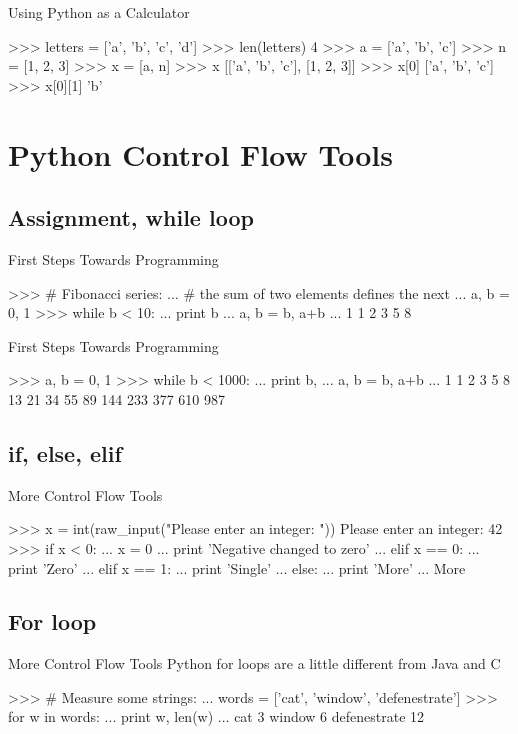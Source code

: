 \documentclass[11pt]{beamer}
\begin{document}
\begin{frame}[containsverbatim]{Using Python as a Calculator}
\begin{python}
>>> letters = ['a', 'b', 'c', 'd']
>>> len(letters)
4
>>> a = ['a', 'b', 'c']
>>> n = [1, 2, 3]
>>> x = [a, n]
>>> x
[['a', 'b', 'c'], [1, 2, 3]]
>>> x[0]
['a', 'b', 'c']
>>> x[0][1]
'b'
\end{python}
\end{frame}

\section{Python Control Flow Tools}
\subsection{Assignment, while loop}
\begin{frame}[containsverbatim]{First Steps Towards Programming}
\begin{python}
>>> # Fibonacci series:
... # the sum of two elements defines the next
... a, b = 0, 1
>>> while b < 10:
...    print b
...    a, b = b, a+b
...
1
1
2
3
5
8
\end{python}
\end{frame}


\begin{frame}[containsverbatim]{First Steps Towards Programming}
\begin{python}
>>> a, b = 0, 1
>>> while b < 1000:
...    print b,
...    a, b = b, a+b
...
1 1 2 3 5 8 13 21 34 55 89 144 233 377 610 987
\end{python}
\end{frame}

\subsection{if, else, elif}
\begin{frame}[containsverbatim]{More Control Flow Tools}
\begin{python}
>>> x = int(raw_input("Please enter an integer: "))
Please enter an integer: 42
>>> if x < 0:
...    x = 0
...    print 'Negative changed to zero'
... elif x == 0:
...    print 'Zero'
... elif x == 1:
...    print 'Single'
... else:
...    print 'More'
...
More
\end{python}
\end{frame}

\subsection{For loop}
\begin{frame}[containsverbatim]{More Control Flow Tools}
Python for loops are a little different from Java and C
\begin{python}
>>> # Measure some strings:
... words = ['cat', 'window', 'defenestrate']
>>> for w in words:
...    print w, len(w)
...
cat 3
window 6
defenestrate 12
\end{python}
\end{frame}
\end{document}
